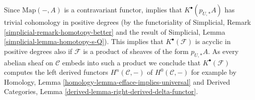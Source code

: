 \begin{example}
Since $\text{Map}(-, A)$ is a contravariant functor, implies that
$K^\bullet(p_{U, *}A)$ has trivial cohomology in positive degrees
(by the functoriality of
Simplicial, Remark \ref{simplicial-remark-homotopy-better}
and the result of
Simplicial, Lemma \ref{simplicial-lemma-homotopy-s-Q}).
This implies that $K^\bullet(\mathcal{F})$ is acyclic in positive
degrees also if $\mathcal{F}$ is a product of sheaves of the form
$p_{U, *}A$. As every abelian sheaf on $\mathcal{C}$ embeds
into such a product we conclude that $K^\bullet(\mathcal{F})$
computes the left derived functors
$H^n(\mathcal{C}, -)$ of $H^0(\mathcal{C}, -)$
for example by
Homology, Lemma \ref{homology-lemma-efface-implies-universal}
and
Derived Categories, Lemma \ref{derived-lemma-right-derived-delta-functor}.
\end{example}

